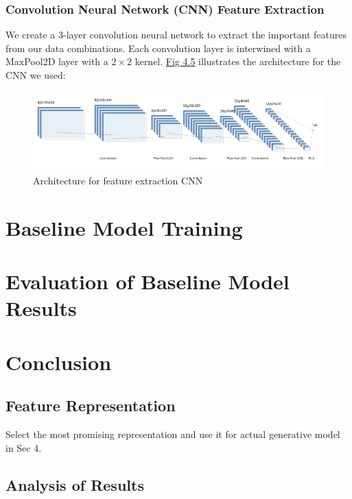 \documentclass[12pt, a4paper]{report}
\theoremstyle{definition}
\begin{document}
\subsubsection{Convolution Neural Network (CNN) Feature Extraction}
\label{sec:4.3.2.2}
We create a 3-layer convolution neural network to extract the important features from our data combinations. Each convolution layer is interwined with a MaxPool2D layer with a $2\times2$ kernel. \hyperref[fig:cnnarch]{Fig 4.5} illustrates the architecture for the CNN we used:
\begin{figure}[H]
    \includegraphics[scale=0.7]{docs/Project Report/Media/nn.png}
    \caption{Architecture for feature extraction CNN}
    \label{fig:cnnarch}
\end{figure}

\section{Baseline Model Training}

\section{Evaluation of Baseline Model Results}

\section{Conclusion}
\subsection{Feature Representation}
Select the most promising representation and use it for actual generative model in Sec 4.

\subsection{Analysis of Results}

\end{document}
